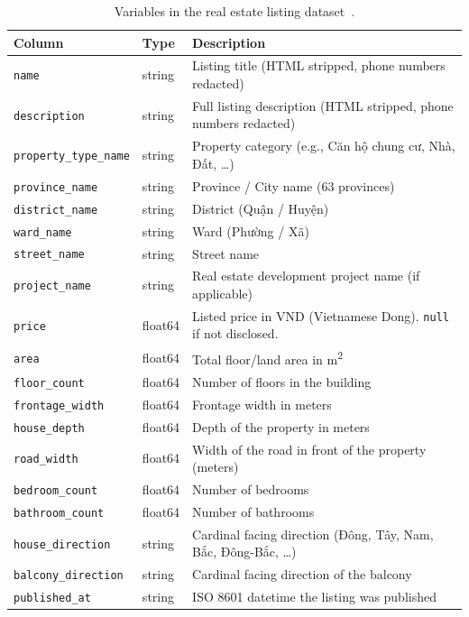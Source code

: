 \begin{table}[htbp]
\centering
\caption[Dataset variables]{Variables in the real estate listing dataset~\cite{tinix_vietnam_real_estate_2026}.}
\label{tab:feature-meanings}
\small
\begin{tabular}{llp{7.2cm}}
\toprule
Column & Type & Description \\
\midrule
\texttt{name} & string & Listing title (HTML stripped, phone numbers redacted) \\
\texttt{description} & string & Full listing description (HTML stripped, phone numbers redacted) \\
\texttt{property\_type\_name} & string & Property category (e.g., Căn hộ chung cư, Nhà, Đất, \ldots) \\
\texttt{province\_name} & string & Province / City name (63 provinces) \\
\texttt{district\_name} & string & District (Quận / Huyện) \\
\texttt{ward\_name} & string & Ward (Phường / Xã) \\
\texttt{street\_name} & string & Street name \\
\texttt{project\_name} & string & Real estate development project name (if applicable) \\
\texttt{price} & float64 & Listed price in VND (Vietnamese Dong). \texttt{null} if not disclosed. \\
\texttt{area} & float64 & Total floor/land area in m\textsuperscript{2} \\
\texttt{floor\_count} & float64 & Number of floors in the building \\
\texttt{frontage\_width} & float64 & Frontage width in meters \\
\texttt{house\_depth} & float64 & Depth of the property in meters \\
\texttt{road\_width} & float64 & Width of the road in front of the property (meters) \\
\texttt{bedroom\_count} & float64 & Number of bedrooms \\
\texttt{bathroom\_count} & float64 & Number of bathrooms \\
\texttt{house\_direction} & string & Cardinal facing direction (Đông, Tây, Nam, Bắc, Đông-Bắc, \ldots) \\
\texttt{balcony\_direction} & string & Cardinal facing direction of the balcony \\
\texttt{published\_at} & string & ISO 8601 datetime the listing was published \\
\bottomrule
\end{tabular}
\end{table}